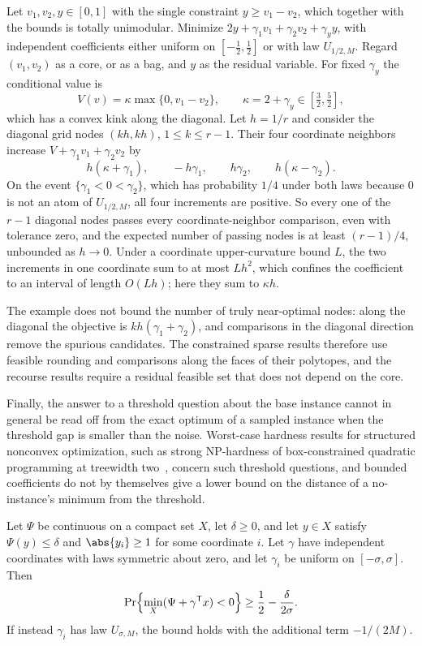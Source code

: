 \begin{example}\label{ex:lim:coupled}
Let $v_1,v_2,y\in[0,1]$ with the single constraint $y\ge v_1-v_2$, which
together with the bounds is totally unimodular. Minimize
$2y+\gamma_1v_1+\gamma_2v_2+\gamma_yy$, with independent coefficients either
uniform on $[-\frac12,\frac12]$ or with law $U_{1/2,M}$. Regard $(v_1,v_2)$
as a core, or as a bag, and $y$ as the residual variable. For fixed
$\gamma_y$ the conditional value is
\[
 V(v)=\kappa\max\{0,v_1-v_2\},\qquad\kappa=2+\gamma_y\in[\tfrac32,\tfrac52],
\]
which has a convex kink along the diagonal. Let $h=1/r$ and consider the
diagonal grid nodes $(kh,kh)$, $1\le k\le r-1$. Their four coordinate
neighbors increase $V+\gamma_1v_1+\gamma_2v_2$ by
\[
 h(\kappa+\gamma_1),\qquad-h\gamma_1,\qquad h\gamma_2,\qquad h(\kappa-\gamma_2).
\]
On the event $\{\gamma_1<0<\gamma_2\}$, which has probability $1/4$ under
both laws because $0$ is not an atom of $U_{1/2,M}$, all four increments are
positive. So every one of the $r-1$ diagonal nodes passes every
coordinate-neighbor comparison, even with tolerance zero, and the expected
number of passing nodes is at least $(r-1)/4$, unbounded as $h\to0$. Under a
coordinate upper-curvature bound $L$, the two increments in one coordinate
sum to at most $Lh^2$, which confines the coefficient to an interval of
length $O(Lh)$; here they sum to $\kappa h$.
\end{example}

The example does not bound the number of truly near-optimal nodes: along the
diagonal the objective is $kh(\gamma_1+\gamma_2)$, and comparisons in the
diagonal direction remove the spurious candidates. The constrained sparse
results therefore use feasible rounding and comparisons along the faces of
their polytopes, and the recourse results require a residual feasible set
that does not depend on the core.

Finally, the answer to a threshold question about the base instance cannot
in general be read off from the exact optimum of a sampled instance when the
threshold gap is smaller than the noise. Worst-case hardness results for
structured nonconvex optimization, such as strong NP-hardness of
box-constrained quadratic programming at treewidth
two~\citep{pia2026-treewidth-and-the-complexity-of}, concern such threshold questions, and bounded
coefficients do not by themselves give a lower bound on the distance of a
no-instance's minimum from the threshold.

\begin{proposition}\label{prop:lim:threshold}
Let $\Psi$ be continuous on a compact set $X$, let $\delta\ge0$, and let
$y\in X$ satisfy $\Psi(y)\le\delta$ and $\abs{y_i}\ge1$ for some coordinate
$i$. Let
$\gamma$ have independent coordinates with laws symmetric about zero, and
let $\gamma_i$ be uniform on $[-\sigma,\sigma]$. Then
\[
 \Pr\Bigl\{\min_X(\Psi+\gamma^{\mathsf T}x)<0\Bigr\}\ge\frac12-\frac\delta{2\sigma}.
\]
If instead $\gamma_i$ has law $U_{\sigma,M}$, the bound holds with the
additional term $-1/(2M)$.
\end{proposition}

